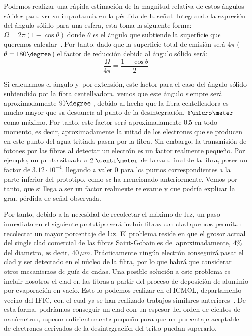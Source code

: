 Podemos realizar una rápida estimación de la magnitud relativa de estos ángulos sólidos para ver su importancia en la pérdida de la señal. Integrando la expresión del ángulo sólido para una esfera, esta toma la siguiente forma: $\Omega=2\pi(1-\cos{\theta})$ donde $\theta$ es el ángulo que subtiende la superficie que queremos calcular~\cite{unizar}. Por tanto, dado que la superficie total de emisión será $4\pi$ ($\theta=180\degree$) el factor de reducción debido al ángulo sólido será:
\begin{equation}
\frac{\Omega}{4\pi}=\frac{1-\cos{\theta}}{2}
\label{factordebidoalangulosolido}
\end{equation}

Si  calculamos el ángulo y, por extensión, este factor para el caso del ángulo sólido subtendido por la fibra centelleadora, vemos que este ángulo siempre será aproximadamente $90\degree$ , debido al hecho que la fibra centelleadora es mucho mayor que su destancia al punto de la desintegración, $5\micro\meter$ como máximo. Por tanto, este factor será aproximadamente $0.5$ en todo momento, es decir, aproximadamente la mitad de los electrones que se producen en este punto del agua tritiada pasan por la fibra. Sin embargo, la transmisión de fotones por las fibras al detectar un electrón es un factor realmente pequeño. Por ejemplo, un punto situado a $2~\centi\meter$ de la cara final de la fibra, posee un factor de $3.12\cdotp 10^{-4}$, llegando a valer $0$ para los puntos correspondientes a la parte inferior del prototipo, como se ha mencionado anteriormente. Vemos por tanto, que si llega a ser un factor realmente relevante y que podría explicar la gran pérdida de señal observada. 

Por tanto, debido a la necesidad de recolectar el máximo de luz, un paso inmediato en el siguiente prototipo será incluir fibras con clad que nos permitan recolectar un mayor porcentaje de luz. El problema reside en que el grosor actual del single clad comercial de las fibras Saint-Gobain es de, aproximadamente, $4\%$ del diametro, es decir, $40~\mu m$. Prácticamente ningún electrón conseguirá pasar el clad y ser detectado en el núcleo de la fibra, por lo que habrá que considerar otros mecanismos de guía de ondas. Una posible solución a este problema es incluir nosotros el clad en las fibras a partir del proceso de deposición de aluminio por evaporación en vacío. Esto lo podemos realizar en el ICMOL, departamento vecino del IFIC, con el cual ya se han realizado trabajos similares anteriores~\cite{cladtesis,cladarticulo}. De esta forma, podríamos conseguir un clad con un espesor del orden de cientos de nanómetros, espesor suficientemente pequeño para que un porcentaje aceptable de electrones derivados de la desintegración del tritio puedan superarlo. 

